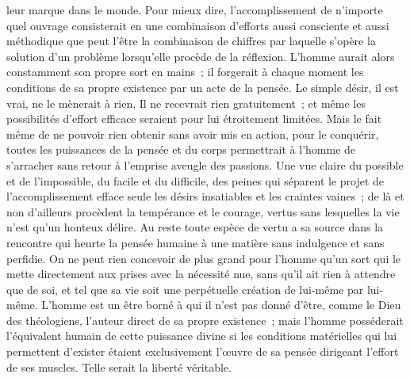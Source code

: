 \documentclass[french,twoside]{book} %
\begin{document}
leur marque dans le monde. Pour mieux dire, l'accomplissement de n'importe quel ouvrage consisterait en une combinaison d'efforts aussi consciente et aussi méthodique que peut l'être la combinaison de chiffres par laquelle s'opère la solution d'un problème lorsqu'elle procède de la réflexion. L'homme aurait alors constamment son propre sort en mains ; il forgerait à chaque moment les conditions de sa propre existence par un acte de la pensée. Le simple désir, il est vrai, ne le mènerait à rien, Il ne recevrait rien gratuitement ; et même les possibilités d'effort efficace seraient pour lui étroitement limitées. Mais le fait même de ne pouvoir rien obtenir sans avoir mis en action, pour le conquérir, toutes les puissances de la pensée et du corps permettrait à l'homme de s'arracher sans retour à l'emprise aveugle des passions. Une vue claire du possible et de l'impossible, du facile et du difficile, des peines qui séparent le projet de l'accomplissement efface seule les désirs insatiables et les craintes vaines ; de là et non d'ailleurs procèdent la tempérance et le courage, vertus sans lesquelles la vie n'est qu'un honteux délire. Au reste toute espèce de vertu a sa source dans la rencontre qui heurte la pensée humaine à une matière sans indulgence et sans perfidie. On ne peut rien concevoir de plus grand pour l'homme qu'un sort qui le mette directement aux prises avec la nécessité nue, sans qu'il ait rien à attendre que de soi, et tel que sa vie soit une perpétuelle création de lui-même par lui-même. L'homme est un être borné à qui il n'est pas donné d'être, comme le Dieu des théologiens, l'auteur direct de sa propre existence ; mais l'homme posséderait l'équivalent humain de cette puissance divine si les conditions matérielles qui lui permettent d'exister étaient exclusivement l'œuvre de sa pensée dirigeant l'effort de ses muscles. Telle serait la liberté véritable.\par
\end{document}
